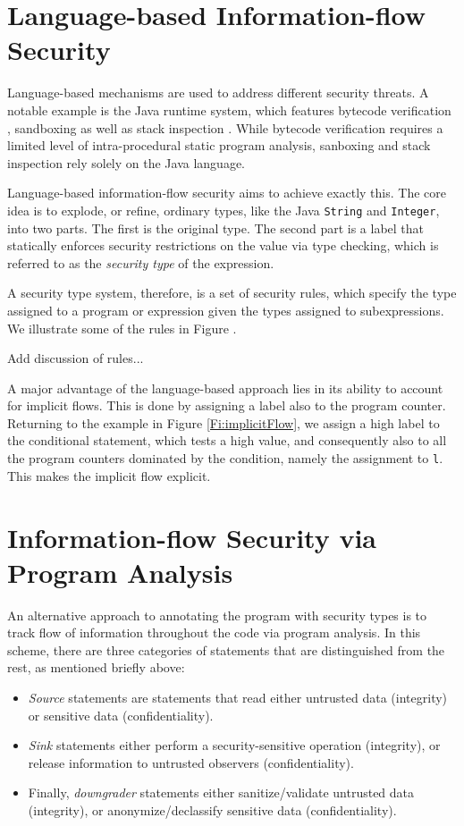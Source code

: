 \section{Language-based Information-flow Security}

Language-based mechanisms are used to address different security threats. A notable example is the Java runtime system, which features bytecode verification \cite{XXX}, sandboxing \cite{XXX} as well as stack inspection \cite{XXX}. While bytecode verification requires a limited level of intra-procedural static program analysis, sanboxing and stack inspection rely solely on the Java language.

Language-based information-flow security aims to achieve exactly this. The core idea is to explode, or refine, ordinary types, like the Java {\tt String} and {\tt Integer}, into two parts. The first is the original type. The second part is a label that statically enforces security restrictions on the value via type checking, which is referred to as the \emph{security type} of the expression.

A security type system, therefore, is a set of security rules, which specify the type assigned to a program or expression given the types assigned to subexpressions. We illustrate some of the rules in Figure \cite{SabelfeldJournalPaper}.

 Add discussion of rules...

A major advantage of the language-based approach lies in its ability to account for implicit flows. This is done by assigning a label also to the program counter. Returning to the example in Figure \ref{Fi:implicitFlow}, we assign a high label to the conditional statement, which tests a high value, and consequently also to all the program counters dominated by the condition, namely the assignment to {\tt l}. This makes the implicit flow explicit. 


\section{Information-flow Security via Program Analysis}

An alternative approach to annotating the program with security types is to track flow of information throughout the code via program analysis. In this scheme, there are three categories of statements that are distinguished from the rest, as mentioned briefly above:
\begin{itemize}
	\item \emph{Source} statements are statements that read either untrusted data (integrity) or sensitive data (confidentiality).
	\item \emph{Sink} statements either perform a security-sensitive operation (integrity), or release information to untrusted observers (confidentiality).
	\item Finally, \emph{downgrader} statements either sanitize/validate untrusted data (integrity), or anonymize/declassify sensitive data (confidentiality).
\end{itemize}


